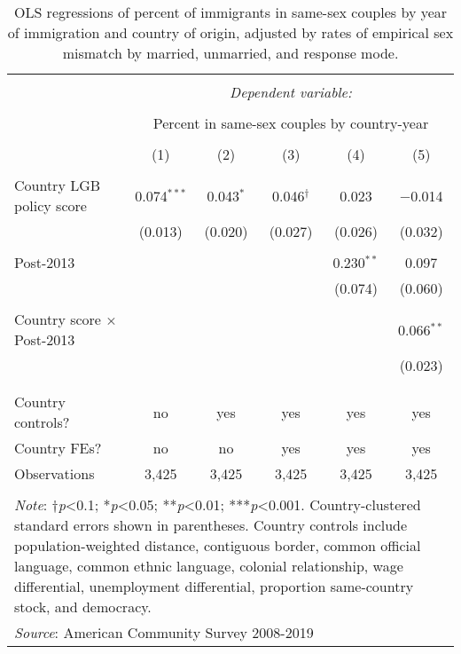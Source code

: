 \documentclass[
  11pt,
]{article}
\begin{document}
\begin{table}[H] \centering 
  \caption{OLS regressions of percent of immigrants in same-sex couples by year of immigration and country of origin, adjusted by rates of empirical sex mismatch by married, unmarried, and response mode. } 
  \label{tab:country-props-adj} 
\begin{tabular}{@{\extracolsep{5pt}}lccccc} 
\\[-1.8ex]\hline 
\hline \\[-1.8ex] 
 & \multicolumn{5}{c}{\textit{Dependent variable:}} \\ 
\cline{2-6} 
\\[-1.8ex] & \multicolumn{5}{c}{Percent in same-sex couples by country-year} \\ 
\\[-1.8ex] & (1) & (2) & (3) & (4) & (5)\\ 
\hline \\[-1.8ex] 
 Country LGB policy score & 0.074$^{***}$ & 0.043$^{*}$ & 0.046$^{†}$ & 0.023 & $-$0.014 \\ 
  & (0.013) & (0.020) & (0.027) & (0.026) & (0.032) \\ 
  & & & & & \\ 
 Post-2013 &  &  &  & 0.230$^{**}$ & 0.097 \\ 
  &  &  &  & (0.074) & (0.060) \\ 
  & & & & & \\ 
 Country score × Post-2013 &  &  &  &  & 0.066$^{**}$ \\ 
  &  &  &  &  & (0.023) \\ 
  & & & & & \\ 
\hline \\[-1.8ex] 
Country controls? & no & yes & yes & yes & yes \\ 
Country FEs? & no & no & yes & yes & yes \\ 
Observations & 3,425 & 3,425 & 3,425 & 3,425 & 3,425 \\ 
\hline 
\hline \\[-1.8ex] 
\multicolumn{6}{l}{\parbox[t]{.8\textwidth}{\textit{Note}: †\textit{p}<0.1; *\textit{p}<0.05; **\textit{p}<0.01; ***\textit{p}<0.001. Country-clustered standard errors shown in parentheses. Country controls include population-weighted distance, contiguous border, common official language, common ethnic language, colonial relationship, wage differential, unemployment differential, proportion same-country stock, and democracy.}} \\ 
\multicolumn{6}{l}{\textit{Source}: American Community Survey 2008-2019} \\ 
\end{tabular} 
\end{table}
\end{document}
